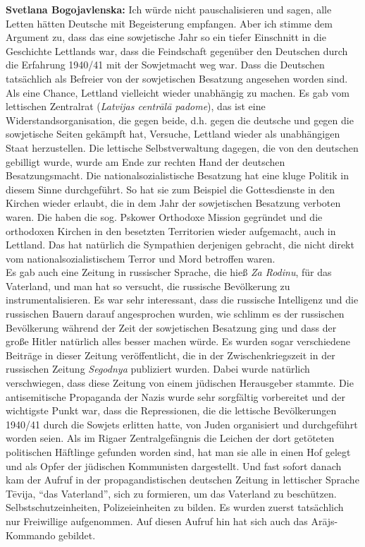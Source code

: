 \textbf{Svetlana Bogojavlenska:} Ich würde nicht pauschalisieren und sagen, alle Letten hätten Deutsche mit Begeisterung empfangen. Aber ich stimme dem Argument zu, dass das eine sowjetische Jahr so ein tiefer Einschnitt in die Geschichte Lettlands war, dass die Feindschaft gegenüber den Deutschen durch die Erfahrung 1940/41 mit der Sowjetmacht weg war. Dass die Deutschen tatsächlich als Befreier von der sowjetischen Besatzung angesehen worden sind. Als eine Chance, Lettland vielleicht wieder unabhängig zu machen. Es gab vom lettischen Zentralrat (\textit{Latvijas centrālā padome}), das ist eine Widerstandsorganisation, die gegen beide, d.h. gegen die deutsche und gegen die sowjetische Seiten gekämpft hat, Versuche, Lettland wieder als unabhängigen Staat herzustellen. Die lettische Selbstverwaltung dagegen, die von den deutschen gebilligt wurde, wurde am Ende zur rechten Hand der deutschen Besatzungsmacht. Die nationalsozialistische Besatzung hat eine kluge Politik in diesem Sinne durchgeführt. So hat sie zum Beispiel die Gottesdienste in den Kirchen wieder erlaubt, die in dem Jahr der sowjetischen Besatzung verboten waren. Die haben die sog. Pskower Orthodoxe Mission gegründet und die orthodoxen Kirchen in den besetzten Territorien wieder aufgemacht, auch in Lettland. Das hat natürlich die Sympathien derjenigen gebracht, die nicht direkt vom nationalsozialistischem Terror und Mord betroffen waren.\\
Es gab auch eine Zeitung in russischer Sprache, die hieß \textit{Za Rodinu}, für das Vaterland, und man hat so versucht, die russische Bevölkerung zu instrumentalisieren. Es war sehr interessant, dass die russische Intelligenz und die russischen Bauern darauf angesprochen wurden, wie schlimm es der russischen Bevölkerung während der Zeit der sowjetischen Besatzung ging und dass der große Hitler natürlich alles besser machen würde. Es wurden sogar verschiedene Beiträge in dieser Zeitung veröffentlicht, die in der Zwischenkriegszeit in der russischen Zeitung \textit{Segodnya} publiziert wurden. Dabei wurde natürlich verschwiegen, dass diese Zeitung von einem jüdischen Herausgeber stammte. 
Die antisemitische Propaganda der Nazis wurde sehr sorgfältig vorbereitet und der wichtigste Punkt war, dass die Repressionen, die die lettische Bevölkerungen 1940/41 durch die Sowjets erlitten hatte, von Juden organisiert und durchgeführt worden seien. Als im Rigaer Zentralgefängnis die Leichen der dort getöteten politischen Häftlinge gefunden worden sind, hat man sie alle in einen Hof gelegt und als Opfer der jüdischen Kommunisten dargestellt. Und fast sofort danach kam der Aufruf in der propagandistischen deutschen Zeitung in lettischer Sprache Tēvija, “das Vaterland”, sich zu formieren, um das Vaterland zu beschützen. Selbstschutzeinheiten, Polizeieinheiten zu bilden. Es wurden zuerst tatsächlich nur Freiwillige aufgenommen. Auf diesen Aufruf hin hat sich auch das Arājs-Kommando gebildet.

